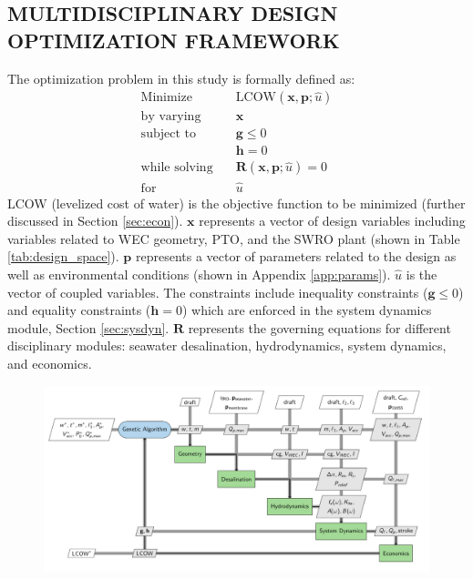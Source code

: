 \documentclass[twocolumn,10pt]{asme2e}
\begin{document}
\subsection{MULTIDISCIPLINARY DESIGN OPTIMIZATION FRAMEWORK}
The optimization problem in this study is formally defined as:
\begin{align*} 
    \text{Minimize} \quad & \text{LCOW}(\mathbf{x},\mathbf{p}; \hat{u})  \\
    \text{by varying} \quad & \mathbf{x}\\
    \text{subject to } \quad &  \mathbf{g} \leq 0 \\
                             &  \mathbf{h} = 0 \\
    \text{while solving} \quad & \mathbf{R}(\mathbf{x},\mathbf{p};\hat{u}) = 0\\
    \text{for } \quad & \hat{u}
    \label{eq:problem}
\end{align*}
\noindent LCOW (levelized cost of water) is the objective function to be minimized (further discussed in Section \ref{sec:econ}). $\mathbf{x}$ represents a vector of design variables including variables related to WEC geometry, PTO, and the SWRO plant (shown in Table \ref{tab:design_space}). $\mathbf{p}$ represents a vector of parameters related to the design as well as environmental conditions (shown in Appendix \ref{app:params}). $\hat{u}$ is the vector of coupled variables. The constraints include inequality constraints ($\mathbf{g} \leq 0$) and equality constraints ($\mathbf{h}=0$) which are enforced in the system dynamics module, Section \ref{sec:sysdyn}. $\mathbf{R}$ represents the governing equations for different disciplinary modules: seawater desalination, hydrodynamics, system dynamics, and economics. 

\begin{figure}
    \centering
    \includegraphics[width=0.8\linewidth]{../figs/xDSM.pdf}
    \label{fig:xdsm}
\end{figure}
\end{document}
